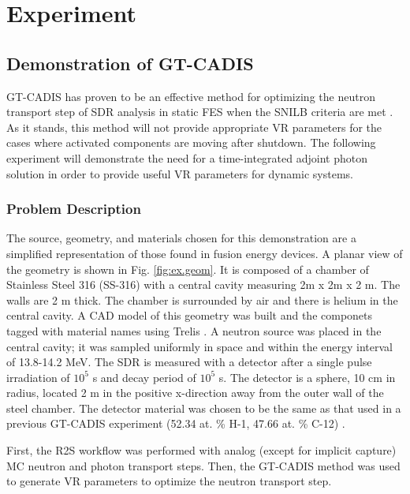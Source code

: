 
\chapter{Experiment} \label{ch:experiment}

\section{Demonstration of GT-CADIS} \label{sec:gtcadis}
GT-CADIS has proven to be an effective method 
for optimizing the neutron transport step of 
SDR analysis in static FES when the SNILB criteria are met \cite{gtcadis}.  
As it stands, this method
will not provide appropriate VR parameters for the cases where activated
components are moving
after shutdown.  The following experiment will demonstrate the need for a
time-integrated adjoint photon solution in order to provide useful VR parameters for
dynamic systems.

\subsection{Problem Description} \label{sec:description}
The source, geometry, and materials chosen for this demonstration are a 
simplified representation of those found in fusion energy devices.
A planar view of the geometry is shown in Fig. \ref{fig:ex.geom}.
It is composed of a chamber of Stainless Steel 316 (SS-316) with a central cavity measuring
2m x 2m x 2 m.  The walls are 2 m thick.  The chamber is surrounded by air and
there is helium in the central cavity.  A CAD model of this geometry was built and 
the componets tagged with material names using
Trelis \cite{trelis}.  
A neutron source was placed in the central cavity; it was sampled uniformly in
space and within the energy interval of 13.8-14.2 MeV.
The SDR is measured with a detector after a single pulse irradiation of $10^5$ s and
decay period of $10^5$ s.  The detector is a sphere, 10 cm in radius, located
2 m in the positive x-direction away from the outer wall of the steel chamber.
The detector material was chosen to
be the same as that used in a previous GT-CADIS experiment (52.34 at. \% H-1,
47.66 at. \% C-12) \cite{gtcadis}.  

First, the R2S workflow was performed with analog (except for implicit capture)
MC neutron and photon transport steps.
Then, the GT-CADIS method was used to generate VR parameters
to optimize the neutron transport step.

